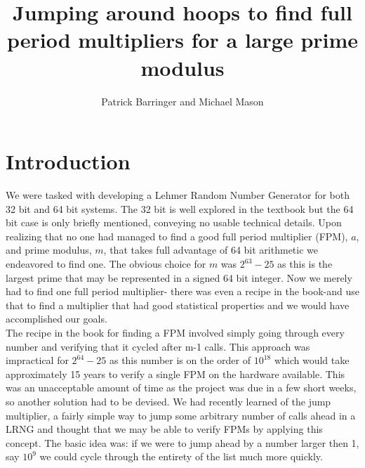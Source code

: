 \documentclass[11pt]{article} %
\title{Jumping around hoops to find full period multipliers for a large prime modulus}
\author{Patrick Barringer and Michael Mason}
\begin{document}
\maketitle

\section{Introduction}
We were tasked with developing a Lehmer Random Number Generator for both 32 bit and 64 bit systems. The 32 bit is well explored in the textbook but the 64 bit case is only briefly mentioned, conveying no usable technical details. Upon realizing that no one had managed to find a good full period multiplier (FPM), $a$, and prime modulus, $m$, that takes full advantage of 64 bit arithmetic we endeavored to find one. The obvious choice for $m$ was $2^{63}-25$ as this is the largest prime that may be represented in a signed 64 bit integer. Now we merely had to find one full period multiplier- there was even a recipe in the book-and use that to find a multiplier that had good statistical properties and we would have accomplished our goals.
\\
The recipe in the book for finding a FPM involved simply going through every number and verifying that it cycled after m-1 calls. This approach was impractical for $2^{64}-25$ as this number is on the order of $10^{18}$ which would take approximately 15 years to verify a single FPM on the hardware available. This was an unacceptable amount of time as the project was due in a few short weeks, so another solution had to be devised. We had recently learned of the jump multiplier, a fairly simple way to jump some arbitrary number of calls ahead in a LRNG and thought that we may be able to verify FPMs by applying this concept. The basic idea was: if we were to jump ahead by a number larger then 1, say $10^9$ we could cycle through the entirety of the list much more quickly.
\end{document}
